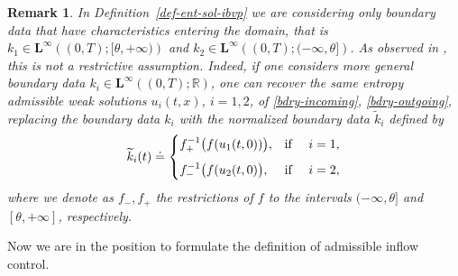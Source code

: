 \documentclass[a4paper, 10pt, final]{article}
\newtheorem{remark}{Remark}[section]
\newcommand{\R}{\mathbb{R}} \newcommand{\N}{\mathbb{N}}
\begin{document}
 
\begin{remark}\upshape
  In Definition~\ref{def-ent-sol-ibvp}
  we are considering only boundary data that have characteristics entering the domain, 
  that is  $k_1 \in \mathbf{L^\infty}\left((0,T); [\theta,+\infty) \right)$ 
  and $k_2 \in \mathbf{L^\infty}\left((0,T); (-\infty, \theta] \right)$.
  As observed in \cite{lf}, this is not a restrictive assumption. 
  Indeed, if one considers more general boundary data $k_i \in \mathbf{L^\infty}\left((0,T);\R\right)$,
  one can recover the same
  entropy admissible weak solutions $u_i(t,x)$, $i=1,2$, 
  of \eqref{bdry-incoming}, \eqref{bdry-outgoing},
  replacing the boundary data $k_i$ with the normalized boundary data
  $\widetilde k_i$  defined by
  \begin{equation}
    \label{normal-bdry-data25}
    \widetilde k_i(t)\doteq 
    \begin{cases}
      f_+^{-1}\big(f(u_1(t,0))\big), & \textrm{if} \quad\ i=1,
      \\
      \noalign{\medskip}
      f_-^{-1}\big(f(u_2(t,0)\big), & \textrm{if} \quad\ i=2,
    \end{cases}
  \end{equation}
  where we denote as $f_-, f_+$ the restrictions of $f$ to the intervals $(-\infty, \theta]$
  and $[\theta, +\infty]$, respectively.
\end{remark}
%
Now we are in the position to formulate the definition of admissible inflow control.
\end{document}
